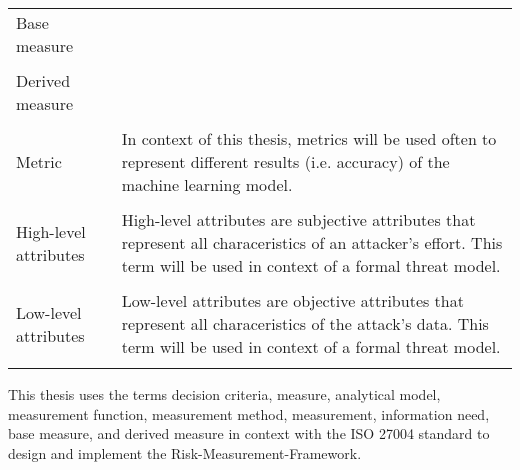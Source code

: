 \begin{center}
  \begin{tabular}{ |L{4cm}|L{10cm}|  }
    \hline
    Base measure & \\
    & \\
    \hline
    Derived measure & \\
    & \\
    \hline
    Metric & In context of this thesis, metrics will be used often to represent different results (i.e. accuracy) of the machine learning model. \\
    & \\
    \hline
    High-level attributes & High-level attributes are subjective attributes that represent all characeristics of an attacker's effort. This term will be used in context of a formal threat model. \\
    & \\
    \hline
    Low-level attributes & Low-level attributes are objective attributes that represent all characeristics of the attack's data. This term will be used in context of a formal threat model. \\
    & \\
    \hline
  \end{tabular}
\end{center}

This thesis uses the terms decision criteria, measure, analytical model, measurement function, measurement method, measurement, information need, base measure, and derived measure in context with the ISO 27004 standard to design and implement the Risk-Measurement-Framework.
